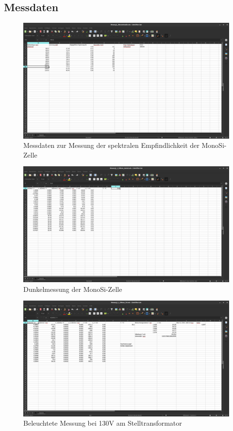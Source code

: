 \clearpage
\subsection{Messdaten}
\begin{figure}[h]
    \captionsetup{justification=centering,margin=2cm}
    \centering
    \includegraphics[angle = 90, width = 12cm]{Bilder/Daten/MessunngMonoSI.png}
    \caption{Messdaten zur Messung der spektralen Empfindlichkeit der MonoSi-Zelle}
\end{figure}


\begin{figure}[h]
    \captionsetup{justification=centering,margin=2cm}
    \centering
    \includegraphics[angle = 90, width = 12cm]{Bilder/Daten/MessunngMonoSiDunkel.png}
    \caption{Dunkelmessung der MonoSi-Zelle}
\end{figure}

\begin{figure}[h]
    \captionsetup{justification=centering,margin=2cm}
    \centering
    \includegraphics[angle = 90, width = 12cm]{Bilder/Daten/MessunngMonoSi130.png}
    \caption{Beleuchtete Messung bei 130V am Stelltransformator}
\end{figure}

